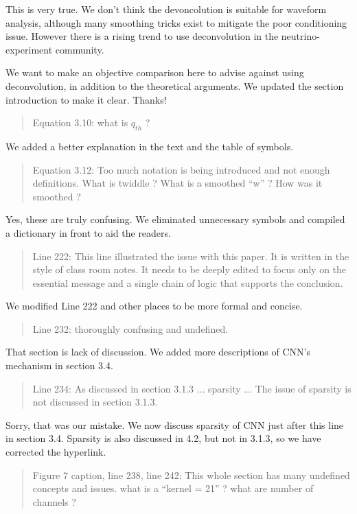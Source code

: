 \documentclass[12pt]{article}
\begin{document}
This is very true.  We don't think the devoncolution is suitable for waveform analysis, although many smoothing tricks exist to mitigate the poor conditioning issue.  However there is a rising trend to use deconvolution in the neutrino-experiment community.

We want to make an objective comparison here to advise against using deconvolution, in addition to the theoretical arguments.  We updated the section introduction to make it clear.  Thanks!

\begin{quote}
Equation 3.10: what is $q_{th}$ ?
\end{quote}

We added a better explanation in the text and the table of symbols.

\begin{quote}
Equation 3.12: Too much notation is being introduced and not enough definitions. What is twiddle ? What is a smoothed ``w'' ? How was it smoothed ?
\end{quote}

Yes, these are truly confusing. We eliminated unnecessary symbols and compiled a dictionary in front to aid the readers. 

\begin{quote}
Line 222: This line illustrated the issue with this paper. It is written in the style of class room notes. It needs to be deeply edited to focus only on the essential message and a single chain of logic that supports the conclusion.
\end{quote}

We modified Line 222 and other places to be more formal and concise.

\begin{quote}
Line 232: thoroughly confusing and undefined.
\end{quote}

That section is lack of discussion.  We added more descriptions of CNN's mechanism in section 3.4.

\begin{quote}
Line 234: As discussed in section 3.1.3 ... sparsity ... The issue of sparsity is not discussed in section 3.1.3.
\end{quote}

Sorry, that was our mistake. We now discuss sparsity of CNN just after this line in section 3.4. Sparsity is also discussed in 4.2, but not in 3.1.3, so we have corrected the hyperlink.

\begin{quote}
Figure 7 caption, line 238, line 242: This whole section has many undefined concepts and issues. what is a ``kernel = 21'' ? what are number of channels ?
\end{quote}
\end{document}

